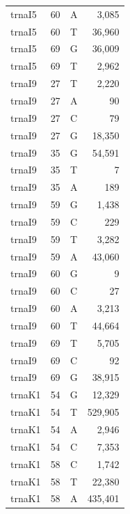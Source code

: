 \documentclass[12pt]{rockefeller}
\begin{document}
{\begin{center}
\begin{supertabular}{|l|r|c|r|}
  trnaI5 &        60 &          A &      3,085 \\
  trnaI5 &        60 &          T &     36,960 \\
  trnaI5 &        69 &          G &     36,009 \\
  trnaI5 &        69 &          T &      2,962 \\
  trnaI9 &        27 &          T &      2,220 \\
  trnaI9 &        27 &          A &         90 \\
  trnaI9 &        27 &          C &         79 \\
  trnaI9 &        27 &          G &     18,350 \\
  trnaI9 &        35 &          G &     54,591 \\
  trnaI9 &        35 &          T &          7 \\
  trnaI9 &        35 &          A &        189 \\
  trnaI9 &        59 &          G &      1,438 \\
  trnaI9 &        59 &          C &        229 \\
  trnaI9 &        59 &          T &      3,282 \\
  trnaI9 &        59 &          A &     43,060 \\
  trnaI9 &        60 &          G &          9 \\
  trnaI9 &        60 &          C &         27 \\
  trnaI9 &        60 &          A &      3,213 \\
  trnaI9 &        60 &          T &     44,664 \\
  trnaI9 &        69 &          T &      5,705 \\
  trnaI9 &        69 &          C &         92 \\
  trnaI9 &        69 &          G &     38,915 \\
  trnaK1 &        54 &          G &     12,329 \\
  trnaK1 &        54 &          T &    529,905 \\
  trnaK1 &        54 &          A &      2,946 \\
  trnaK1 &        54 &          C &      7,353 \\
  trnaK1 &        58 &          C &      1,742 \\
  trnaK1 &        58 &          T &     22,380 \\
  trnaK1 &        58 &          A &    435,401 \\

\end{supertabular}
\end{center}}
\end{document}
